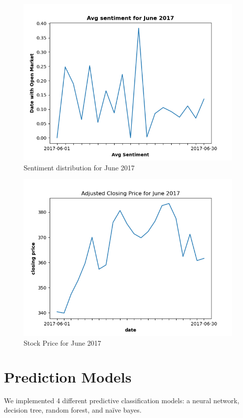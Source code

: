 \documentclass[12pt, notitlepage]{article}
\begin{document}
\begin{figure}[H]
	\centering
	\includegraphics[scale=0.8]{images/sentiment_overtime.png}
	\caption{Sentiment distribution for June 2017}
	\label{fig:SO}
\end{figure}
\begin{figure}[H]
	\centering
	\includegraphics[scale=0.8]{images/stock_overtime.png}
	\caption{Stock Price for June 2017}
	\label{fig:SP}
\end{figure}

\section{Prediction Models}
We implemented 4 different predictive classification models: a neural network, decision tree, random forest, and naïve bayes.
\end{document}
